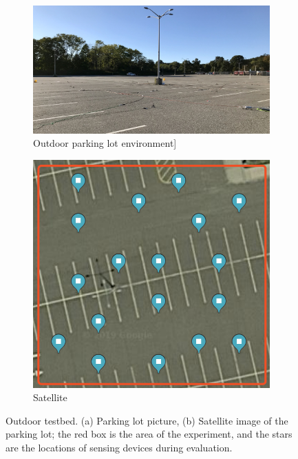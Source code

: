 \begin{figure}
	\centering
	\begin{subfigure}[t]{0.585\textwidth}
		\includegraphics[width=\textwidth]{chapters/ipsn/figures/outdoor.jpg}
		\caption{Outdoor parking lot environment]}
	\end{subfigure}
	\qquad
	\hspace{-0.15in}
	\begin{subfigure}[t]{0.33\textwidth}
		\includegraphics[width=\textwidth]{chapters/ipsn/figures/outdoor-sate.png}
		\caption{Satellite}
	\end{subfigure}
	\caption{Outdoor testbed. (a) Parking lot picture, (b)
          Satellite image of the parking lot; the red box is the area
          of the experiment, and the stars are the locations of
          sensing devices during evaluation.}
	\label{fig:outdoor}
\end{figure}

